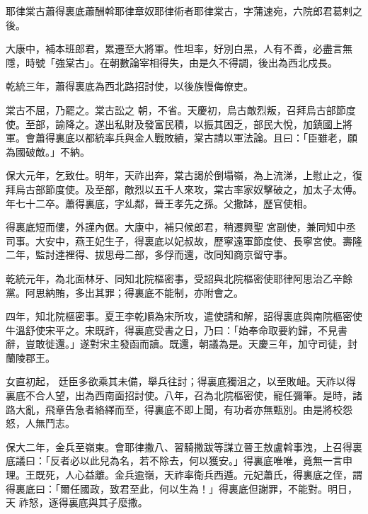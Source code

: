 
\begin{pinyinscope}

 耶律棠古蕭得裏底蕭酬斡耶律章奴耶律術者耶律棠古，字蒲速宛，六院郎君葛剌之後。



 大康中，補本班郎君，累遷至大將軍。性坦率，好別白黑，人有不善，必盡言無隱，時號「強棠古」。在朝數論宰相得失，由是久不得調，後出為西北戍長。



 乾統三年，蕭得裏底為西北路招討使，以後族慢侮僚吏。



 棠古不屈，乃罷之。棠古訟之
 朝，不省。天慶初，烏古敵烈叛，召拜烏古部節度使。至部，諭降之。遂出私財及發富民積，以振其困乏，部民大悅，加鎮國上將軍。會蕭得裏底以都統率兵與金人戰敗績，棠古請以軍法論。且曰：「臣雖老，願為國破敵。」不納。



 保大元年，乞致仕。明年，天祚出奔，棠古謁於倒塌嶺，為上流涕，上慰止之，復拜烏古部節度使。及至部，敵烈以五千人來攻，棠古率家奴擊破之，加太子太傅。年七十二卒。蕭得裏底，字乣鄰，晉王孝先之孫。父撒缽，歷官使相。



 得裏底短而僂，外謹內倨。大康中，補只候郎君，稍遷興聖
 宮副使，兼同知中丞司事。大安中，燕王妃生子，得裏底以妃叔故，歷寧遠軍節度使、長寧宮使。壽隆二年，監討達裡得、拔思母二部，多俘而還，改同知商京留守事。



 乾統元年，為北面林牙、同知北院樞密事，受詔與北院樞密使耶律阿思治乙辛餘黨。阿思納賄，多出其罪；得裏底不能制，亦附會之。



 四年，知北院樞密事。夏王李乾順為宋所攻，遣使請和解，詔得裏底與南院樞密使牛溫舒使宋平之。宋既許，得裏底受書之日，乃曰：「始奉命取要約歸，不見書辭，豈敢徙還。」遂對宋主發函而讀。既還，朝議為是。天慶三年，加守司徒，封蘭陵郡王。



 女直初起，
 廷臣多欲乘其未備，舉兵往討；得裏底獨沮之，以至敗衄。天祚以得裏底不合人望，出為西南面招討使。八年，召為北院樞密使，寵任彌筆。是時，諸路大亂，飛章告急者絡繹而至，得裏底不即上聞，有功者亦無甄別。由是將校怨怒，人無鬥志。



 保大二年，金兵至嶺東。會耶律撒八、習騎撒跋等謀立晉王敖盧斡事洩，上召得裏底議曰：「反者必以此兒為名，若不除去，何以獲安。」得裏底唯唯，竟無一言申理。王既死，人心益離。金兵逾嶺，天祚率衛兵西遁。元妃蕭氏，得裏底之侄，謂得裏底曰：「爾任國政，致君至此，何以生為！」得裏底但謝罪，不能對。明日，天
 祚怒，逐得裏底與其子麼撒。




\end{pinyinscope}
